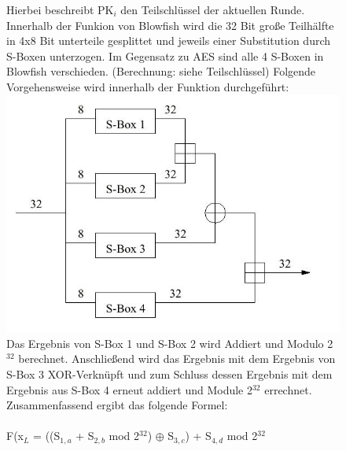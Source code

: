 \documentclass[10pt, a4paper]{scrreprt}
\begin{document}
\begin{figure}[htbp]
\begin{minipage}[t]{10cm}
Hierbei beschreibt PK$_{i}$ den Teilschlüssel der aktuellen Runde. Innerhalb der Funkion von Blowfish wird die 32 Bit große Teilhälfte in 4x8 Bit unterteile gesplittet und jeweils einer Substitution durch S-Boxen unterzogen. Im Gegensatz zu AES sind alle 4 S-Boxen in Blowfish verschieden. (Berechnung: siehe Teilschlüssel) Folgende Vorgehensweise wird innerhalb der Funktion durchgeführt: \\
\includegraphics[scale=0.25]{blowfish_2.JPG} \\ %
Das Ergebnis von S-Box 1 und S-Box 2 wird Addiert und Modulo 2$^{32}$ berechnet. Anschließend wird das Ergebnis mit dem Ergebnis von S-Box 3 XOR-Verknüpft und zum Schluss dessen Ergebnis mit dem Ergebnis aus S-Box 4 erneut addiert und Module 2$^{32}$ errechnet. Zusammenfassend ergibt das folgende Formel: \\ \\
F(x$_{L}$ = ((S$_{1,a}$ + S$_{2,b}$ mod 2$^{32}$) $\oplus$ S$_{3,c}$) + S$_{4,d}$ mod 2$^{32}$ \\ \\
\end{minipage}
\end{figure}
\end{document}
